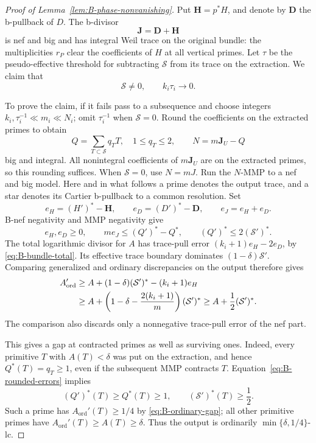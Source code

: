 \begin{proof}[Proof of Lemma~\ref{lem:B-phase-nonvanishing}]
Put $\mathbf H=p^*H$, and denote by $\mathbf D$ the b-pullback
of $D$.  The b-divisor
\[
 \mathbf J=\mathbf D+\mathbf H
\]
is nef and big and has integral Weil trace on the original
bundle: the multiplicities $r_P$ clear the coefficients of
$H$ at all vertical primes.  Let $\tau$ be the pseudo-effective
threshold for subtracting $\mathcal S$ from its trace on the
extraction.  We claim that
\begin{equation}\label{eq:B-threshold-small}
 \mathcal S\ne0,
 \qquad k_i\tau_i\longrightarrow0.
\end{equation}

To prove the claim, if it fails pass to a subsequence and choose
integers
$k_i,\tau_i^{-1}\ll m_i\ll N_i$; omit $\tau_i^{-1}$ when
$\mathcal S=0$.  Round the coefficients on the extracted primes
to obtain
\[
 Q=\sum_{T\subset\mathcal S}q_TT,
 \quad 1\le q_T\le2,
 \qquad N=m\mathbf J_U-Q
\]
big and integral.  All nonintegral coefficients of $m\mathbf J_U$
are on the extracted primes, so this rounding suffices.  When
$\mathcal S=0$, use $N=mJ$.  Run the $N$-MMP to a nef and big
model.  Here and in what follows a prime denotes the output
trace, and a star denotes its Cartier b-pullback to a common
resolution.  Set
\[
 e_H=(H')^*-\mathbf H,\qquad
 e_D=(D')^*-\mathbf D,\qquad e_J=e_H+e_D.
\]
B-nef negativity and MMP negativity give
\begin{equation}\label{eq:B-rounded-errors}
 e_H,e_D\ge0,
 \qquad
 m e_J\le(Q')^*-Q^*,
 \qquad (Q')^*\le2(\mathcal S')^*.
\end{equation}
The total logarithmic divisor for $A$ has trace-pull error
$(k_i+1)e_H-2e_D$, by \eqref{eq:B-bundle-total}.  Its effective
trace boundary dominates $(1-\delta)\mathcal S'$.  Comparing
generalized and ordinary discrepancies on the output therefore
gives
\begin{align}
 A_{\mathrm{ord}}'
 &\ge A+(1-\delta)(\mathcal S')^*-(k_i+1)e_H\notag\\
 &\ge A+
 \left(1-\delta-\frac{2(k_i+1)}m\right)(\mathcal S')^*
 \ge A+\frac12(\mathcal S')^* .
 \label{eq:B-ordinary-gap}
\end{align}
The comparison also discards only a nonnegative trace-pull error
of the nef part.

This gives a gap at contracted primes as well as surviving ones.
Indeed, every primitive $T$ with $A(T)<\delta$ was put on the
extraction, and hence $Q^*(T)=q_T\ge1$, even if the subsequent
MMP contracts $T$.  Equation~\eqref{eq:B-rounded-errors} implies
\begin{equation}\label{eq:B-contracted-prime-bound}
 (Q')^*(T)\ge Q^*(T)\ge1,
 \qquad (\mathcal S')^*(T)\ge\frac12.
\end{equation}
Such a prime has $A_{\mathrm{ord}}'(T)\ge1/4$ by
\eqref{eq:B-ordinary-gap}; all other primitive primes have
$A_{\mathrm{ord}}'(T)\ge A(T)\ge\delta$.  Thus the output is
ordinarily $\min\{\delta,1/4\}$-lc.


\end{proof}
